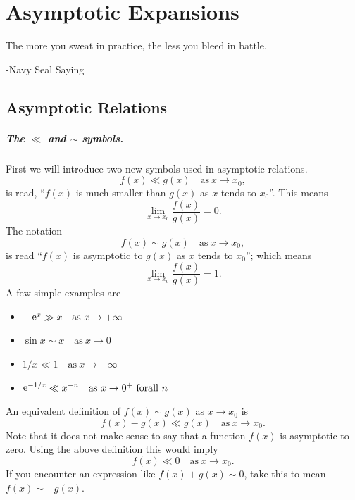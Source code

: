 \flushbottom


\chapter{Asymptotic Expansions}


The more you sweat in practice, the less you bleed in battle.

\begin{flushright}
  -Navy Seal Saying
\end{flushright}

\section{Asymptotic Relations}



\paragraph{The $\boldsymbol{\ll}$ and $\boldsymbol{\sim}$ symbols.}
First we will introduce two new symbols used in asymptotic relations.
\[ f(x) \ll g(x)\quad\mathrm{as}\ x \to x_0,\]
is read, ``$f(x)$ is much smaller than $g(x)$ as $x$ tends to $x_0$''.  
This means
\[\lim_{x \to x_0} \frac{f(x)}{g(x)} = 0.\]
The notation
\[ f(x) \sim g(x)\quad \mathrm{as}\ x \to x_0, \]
is read ``$f(x)$ is asymptotic to $g(x)$ as $x$ tends to $x_0$'';  which means
\[ \lim_{x \to x_0} \frac{f(x)}{g(x)} = 1.\]
A few simple examples are
\begin{itemize}
\item $-\mathop{\mathrm{e}}\nolimits^x \gg x \quad \mathrm{as}\ x \to +\infty$
\item $\sin x \sim x \quad \mathrm{as}\ x \to 0$ 
\item $1/x \ll 1 \quad \mathrm{as}\ x \to +\infty$
\item $\mathop{\mathrm{e}}\nolimits^{-1/x} \ll x^{-n} \quad \mathrm{as}\ x \to 0^+\ \mathrm{for all}\ n$
\end{itemize}


An equivalent definition of $f(x) \sim g(x)$ as $x \to x_0$ is
\[ f(x) - g(x) \ll g(x) \quad \mathrm{as}\ x \to x_0.\]
Note that it does not make sense to say that a function $f(x)$ 
is asymptotic to zero.  Using the above definition this would imply
\[ f(x) \ll 0 \quad \mathrm{as}\ x \to x_0.\]
If you encounter an expression like
$f(x) + g(x) \sim 0$, take this to mean $f(x) \sim - g(x)$.





